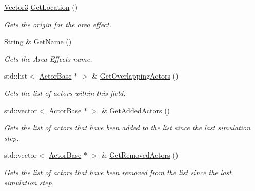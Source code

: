 \begin{DoxyCompactItemize}
\hyperlink{classphys_1_1Vector3}{Vector3} \hyperlink{classphys_1_1AreaEffect_a76040dd90ff314ea6973dccf4e90ba37}{GetLocation} ()
\begin{DoxyCompactList}\small\item\em Gets the origin for the area effect. \item\end{DoxyCompactList}\item 
\hyperlink{namespacephys_aa03900411993de7fbfec4789bc1d392e}{String} \& \hyperlink{classphys_1_1AreaEffect_a31a961aa88c3ba879155f9441dc1da91}{GetName} ()
\begin{DoxyCompactList}\small\item\em Gets the Area Effects name. \item\end{DoxyCompactList}\item 
std::list$<$ \hyperlink{classphys_1_1ActorBase}{ActorBase} $\ast$ $>$ \& \hyperlink{classphys_1_1AreaEffect_ab995fec11d9e5fbae1851109067958db}{GetOverlappingActors} ()
\begin{DoxyCompactList}\small\item\em Gets the list of actors within this field. \item\end{DoxyCompactList}\item 
std::vector$<$ \hyperlink{classphys_1_1ActorBase}{ActorBase} $\ast$ $>$ \& \hyperlink{classphys_1_1AreaEffect_a72a9673c926ce876df630c4aecfc09f6}{GetAddedActors} ()
\begin{DoxyCompactList}\small\item\em Gets the list of actors that have been added to the list since the last simulation step. \item\end{DoxyCompactList}\item 
std::vector$<$ \hyperlink{classphys_1_1ActorBase}{ActorBase} $\ast$ $>$ \& \hyperlink{classphys_1_1AreaEffect_a021763db69e977a3a19ad7cc39df073b}{GetRemovedActors} ()
\begin{DoxyCompactList}\small\item\em Gets the list of actors that have been removed from the list since the last simulation step. \item\end{DoxyCompactList}\end{DoxyCompactItemize}
